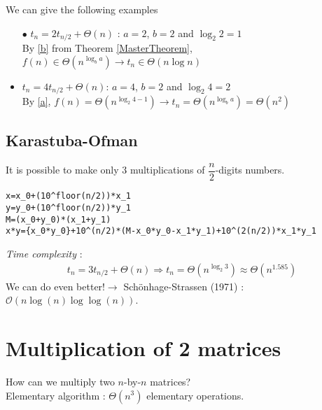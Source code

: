 \begin{example}
\begin{leftbar}
We can give the following examples
\begin{itemize}
\item[$\bullet$] $t_n=2t_{n/2}+\Theta(n)$ : $a=2$, $b=2$ and $\log_2 2=1$\\
By \ref{b} from Theorem \ref{MasterTheorem}, $f(n)\in \Theta\left(n^{\log_ba}\right)\rightarrow t_n \in \Theta(n\log n)$
\item $t_n=4t_{n/2}+\Theta(n)$: $a=4$, $b=2$ and $\log_2 4=2$\\
By \ref{a}, $f(n)=\Theta\left(n^{\log_2 4-1}\right)\rightarrow t_n=\Theta\left(n^{\log_ba}\right)=\Theta\left(n^2\right)$
\end{itemize}
\end{leftbar}
\end{example}


\subsection{Karastuba-Ofman}

It is possible to make only 3 multiplications of $\dfrac{n}{2}$-digits numbers.

\begin{lstlisting}[label={list:c3:Multiply(x,y)},caption=\texttt{Multiply(x,y)} \textmd{(Karastuba-Ofman, 1962)}]
x=x_0+(10^floor(n/2))*x_1
y=y_0+(10^floor(n/2))*y_1
M=(x_0+y_0)*(x_1+y_1)
x*y={x_0*y_0}+10^(n/2)*(M-x_0*y_0-x_1*y_1)+10^(2(n/2))*x_1*y_1
\end{lstlisting}


\emph{Time complexity} : 
\begin{align*}
t_n=3t_{n/2}+\Theta (n) \Rightarrow t_n=\Theta\left(n^{\log_2 3}\right)\approx \Theta\left(n^{1.585}\right)
\end{align*}
We can do even better!$\rightarrow$ Schönhage-Strassen (1971) : $\mathcal{O}(n\log(n)\log\log(n))$.

\section{Multiplication of 2 matrices}

How can we multiply two $n$-by-$n$ matrices?\\
Elementary algorithm : $\Theta(n^3)$ elementary operations.

